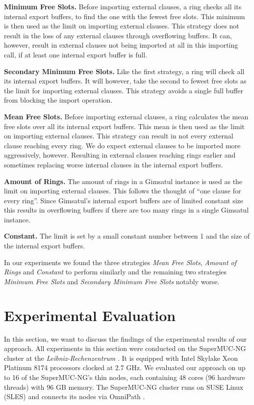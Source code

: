 \documentclass[12pt,a4paper,twoside]{scrartcl}
\numberwithin{equation}{section}
\begin{document}
\textbf{Minimum Free Slots.} Before importing external clauses, a ring checks all its internal export buffers, to find the one with the fewest free slots. This minimum is then used as the limit on importing external clauses.
This strategy does not result in the loss of any external clauses through overflowing buffers. It can, however, result in external clauses not being imported at all in this importing call, if at least one internal export buffer is full.

\textbf{Secondary Minimum Free Slots.} Like the first strategy, a ring will check all its internal export buffers. It will however, take the second to fewest free slots as the limit for importing external clauses. This strategy avoids a single full buffer from blocking the import operation.

\textbf{Mean Free Slots.} Before importing external clauses, a ring calculates the mean free slots over all its internal export buffers. This mean is then used as the limit on importing external clauses.
This strategy can result in not every external clause reaching every ring. We do expect external clauses to be imported more aggressively, however. Resulting in external clauses reaching rings earlier and sometimes replacing worse internal clauses in the internal export buffers.

\textbf{Amount of Rings.} The amount of rings in a Gimsatul instance is used as the limit on importing external clauses.
This follows the thought of ``one clause for every ring''. Since Gimsatul's internal export buffers are of limited constant size this results in overflowing buffers if there are too many rings in a single Gimsatul instance.

\textbf{Constant.} The limit is set by a small constant number between 1 and the size of the internal export buffers.

In our experiments we found the three strategies \textit{Mean Free Slots}, \textit{Amount of Rings} and \textit{Constant} to perform similarly and the remaining two strategies \textit{Minimum Free Slots} and \textit{Secondary Minimum Free Slots} notably worse.


\newpage
\section{Experimental Evaluation}
\label{sec:expEval}

In this section, we want to discuss the findings of the experimental results of our approach. All experiments in this section were conducted on the SuperMUC-NG cluster at the \textit{Leibniz-Rechenzentrum} \cite{superMUC}. It is equipped with Intel Skylake Xeon Platinum 8174 processors clocked at 2.7 GHz. We evaluated our approach on up to 16 of the SuperMUC-NG's thin nodes, each containing 48 cores (96 hardware threads) with 96 GB memory. The SuperMUC-NG cluster runs on SUSE Linux (SLES) and connects its nodes via OmniPath \cite{omniPath}.
\end{document}
